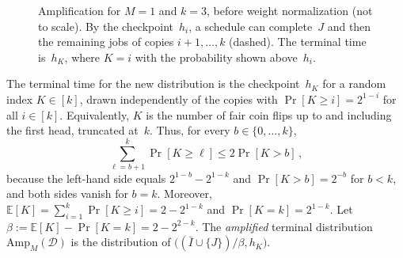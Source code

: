 \documentclass[11pt,letterpaper]{article}
\theoremstyle{definition}
\theoremstyle{remark}
\newcommand{\E}{\mathbb{E}}
\newcommand{\cD}{\mathcal{D}}
\newcommand{\Amp}{\mathrm{Amp}}
\begin{document}
\begin{figure}[t]
  \centering
  \caption{Amplification for $M=1$ and $k=3$, before weight normalization (not to scale). By the checkpoint~$h_i$, a schedule can complete~$J$ and then the remaining jobs of copies $i+1,\dots,k$ (dashed). The terminal time is~$h_K$, where $K=i$ with the probability shown above~$h_i$.}
  \label{fig:amplification}
\end{figure}

The terminal time for the new distribution is the checkpoint~$h_K$ for a random index $K\in[k]$, drawn independently of the copies with $\Pr[K\ge i]=2^{1-i}$ for all $i\in[k]$. Equivalently, $K$ is the number of fair coin flips up to and including the first head, truncated at~$k$. Thus, for every $b\in\{0,\dots,k\}$,
\begin{equation}\label{eq:tail}
  \sum_{\ell=b+1}^k\Pr[K\ge \ell]\le2\Pr[K>b]\,,
\end{equation}
because the left-hand side equals $2^{1-b}-2^{1-k}$ and $\Pr[K>b]=2^{-b}$ for $b<k$, and both sides vanish for $b=k$. Moreover, $\E[K]=\sum_{i=1}^k\Pr[K\ge i]=2-2^{1-k}$ and $\Pr[K=k]=2^{1-k}$. Let $\beta :=\E[K]-\Pr[K=k]=2-2^{2-k}$. The \emph{amplified} terminal distribution $\Amp_M(\cD)$ is the distribution of $\bigl((\bar I\cup\{J\})/\beta,h_K\bigr)$.
\end{document}
